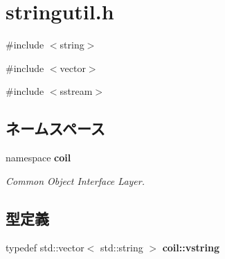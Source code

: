 \section{stringutil.h}
\label{stringutil_8h}
{\ttfamily \#include $<$string$>$}\par
{\ttfamily \#include $<$vector$>$}\par
{\ttfamily \#include $<$sstream$>$}\par
\subsection*{ネームスペース}
\begin{DoxyCompactItemize}
\item 
namespace {\bf coil}


\begin{DoxyCompactList}\small\item\em Common Object Interface Layer. \item\end{DoxyCompactList}

\end{DoxyCompactItemize}
\subsection*{型定義}
\begin{DoxyCompactItemize}
\item 
typedef std::vector$<$ std::string $>$ {\bf coil::vstring}
\end{DoxyCompactItemize}
